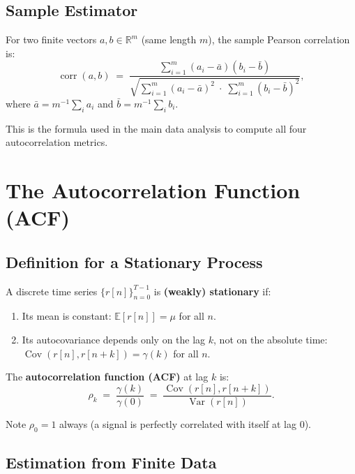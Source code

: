 \documentclass[11pt, a4paper]{article}
\theoremstyle{definition}
\theoremstyle{plain}
\newcommand{\R}{\mathbb{R}}
\newcommand{\E}{\mathbb{E}}
\newcommand{\Cov}{\operatorname{Cov}}
\newcommand{\Var}{\operatorname{Var}}
\newcommand{\corr}{\operatorname{corr}}
\begin{document}
\subsection{Sample Estimator}

For two finite vectors $a, b \in \R^m$ (same length $m$), the sample Pearson
correlation is:
\begin{equation}\label{eq:sample_pearson}
  \corr(a, b) \;=\;
  \frac{\sum_{i=1}^m (a_i - \bar{a})(b_i - \bar{b})}
       {\sqrt{\sum_{i=1}^m (a_i - \bar{a})^2 \;\cdot\; \sum_{i=1}^m (b_i - \bar{b})^2}},
\end{equation}
where $\bar{a} = m^{-1} \sum_i a_i$ and $\bar{b} = m^{-1} \sum_i b_i$.

This is the formula used in the main data analysis to compute all four
autocorrelation metrics.

\section{The Autocorrelation Function (ACF)}

\subsection{Definition for a Stationary Process}

A discrete time series $\{r[n]\}_{n=0}^{T-1}$ is \textbf{(weakly) stationary} if:
\begin{enumerate}[leftmargin=1.5em]
  \item Its mean is constant: $\E[r[n]] = \mu$ for all $n$.
  \item Its autocovariance depends only on the lag $k$, not on the absolute time:
        $\Cov(r[n], r[n+k]) = \gamma(k)$ for all $n$.
\end{enumerate}

The \textbf{autocorrelation function (ACF)} at lag $k$ is:
\begin{equation}
  \rho_k \;=\; \frac{\gamma(k)}{\gamma(0)} \;=\;
  \frac{\Cov(r[n], r[n+k])}{\Var(r[n])}.
\end{equation}

Note $\rho_0 = 1$ always (a signal is perfectly correlated with itself at lag 0).

\subsection{Estimation from Finite Data}
\end{document}
